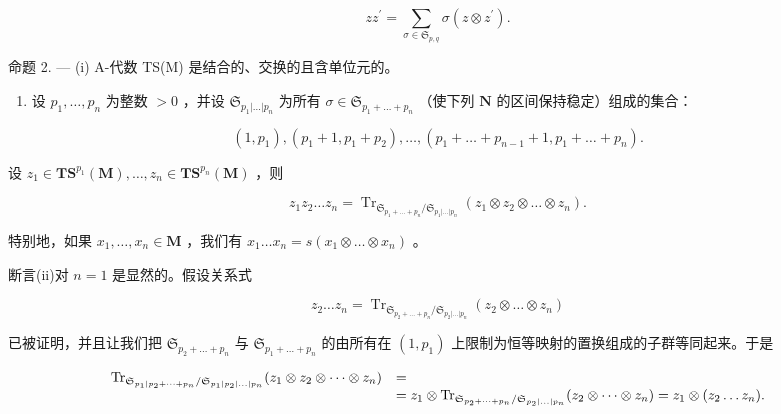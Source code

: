 \[
z z ^ {\prime} = \sum_ {\sigma \in \mathfrak {S} _ {p, q}} \sigma (z \otimes z ^ {\prime}).\tag{5}
\]

命题 2. --- (i) A-代数 TS(M) 是结合的、交换的且含单位元的。

\begin{enumerate}
\def\labelenumi{(\roman{enumi})}
\setcounter{enumi}{1}
\tightlist
\item
  设 \(p_1, \ldots, p_n\) 为整数 \(> 0\) ，并设 \(\mathfrak{S}_{p_1 | \ldots | p_n}\) 为所有 \(\sigma \in \mathfrak{S}_{p_1 + \ldots + p_n}\) （使下列 \(\mathbf{N}\) 的区间保持稳定）组成的集合：
\end{enumerate}

\[
\left(1, p _ {1}\right), \left(p _ {1} + 1, p _ {1} + p _ {2}\right), \dots , \left(p _ {1} + \dots + p _ {n - 1} + 1, p _ {1} + \dots + p _ {n}\right).
\]

设 \(z_{1}\in \mathbf{T}\mathbf{S}^{p_{1}}(\mathbf{M}),\ldots ,z_{n}\in \mathbf{T}\mathbf{S}^{p_{n}}(\mathbf{M})\) ，则

\[
z _ {1} z _ {2} \dots z _ {n} = \operatorname{Tr} _ {\mathfrak {S} _ {p _ {1} + \dots + p _ {n}} / \mathfrak {S} _ {p _ {1} | \dots | p _ {n}}} (z _ {1} \otimes z _ {2} \otimes \dots \otimes z _ {n}).
\]

特别地，如果 \(x_1, \ldots, x_n \in \mathbf{M}\) ，我们有 \(x_1 \ldots x_n = s(x_1 \otimes \ldots \otimes x_n)\) 。

断言(ii)对 \(n = 1\) 是显然的。假设关系式

\[
z _ {2} \dots z _ {n} = \operatorname{Tr} _ {\mathfrak {S} _ {p _ {2} + \dots + p _ {n}} / \mathfrak {S} _ {p _ {2} | \dots | p _ {n}}} (z _ {2} \otimes \dots \otimes z _ {n})
\]

已被证明，并且让我们把 \(\mathfrak{S}_{p_2 + \ldots + p_n}\) 与 \(\mathfrak{S}_{p_1 + \ldots + p_n}\) 的由所有在 \((1, p_1)\) 上限制为恒等映射的置换组成的子群等同起来。于是

\[
\begin{array}{r l} \operatorname{Tr} _ {\mathfrak {S} _ {p _ {1} | p _ {2} + \dots + p _ {n}} / \mathfrak {S} _ {p _ {1} | p _ {2} | \dots | p _ {n}}} (z _ {1} \otimes z _ {2} \otimes \dots \otimes z _ {n}) & = \\ & = z _ {1} \otimes \operatorname{Tr} _ {\mathfrak {S} _ {p _ {2} + \dots + p _ {n}} / \mathfrak {S} _ {p _ {2} | \dots | p _ {n}}} (z _ {2} \otimes \dots \otimes z _ {n}) = z _ {1} \otimes (z _ {2} \dots z _ {n}). \end{array}
\]

